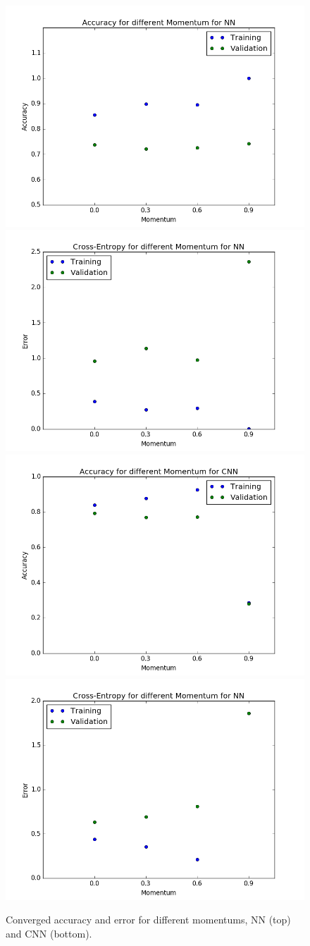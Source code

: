 \documentclass[12pt]{article}
\begin{document}
\begin{figure}[!htb]
\centering
\includegraphics[width=0.4\linewidth]{32/mom/nn/Accuracy.png}
\includegraphics[width=0.4\linewidth]{32/mom/nn/Error.png}
\includegraphics[width=0.4\linewidth]{32/mom/cnn/Accuracy.png}
\includegraphics[width=0.4\linewidth]{32/mom/cnn/Error.png}
\vspace{-0.1in}
\caption{Converged accuracy and error for different momentums, NN (top) and CNN (bottom).}
\label{f32m}
\vspace{-0.1in}
\end{figure}
\end{document}
